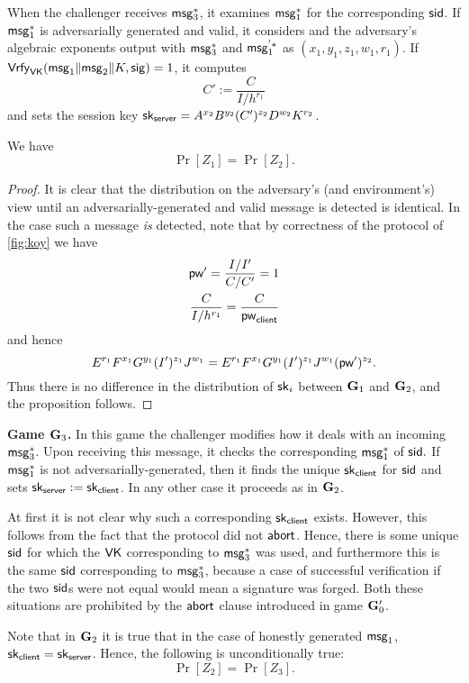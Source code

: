 When the challenger receives $\mathsf{msg}_{3}^{*}$, it examines $\mathsf{msg}_{1}^{*}$ for the corresponding $\mathsf{sid}$. If $\mathsf{msg}_{1}^{*}$ is adversarially generated and valid, it considers and the adversary's algebraic exponents output with $\mathsf{msg}_{3}^{*}$ and $\mathsf{msg}_{1}^{'*}$ as $(x_1,y_1,z_1,w_1,r_1)$. If $\mathsf{Vrfy}_{\mathsf{VK}}(\mathsf{msg}_{1}\|\mathsf{msg}_{2}\|K,\mathsf{sig})=1$, it computes $$C':= \frac{C}{I/h^{r_1}}$$ and sets the session key $\mathsf{sk}_{\mathsf{server}} = A^{x_2}B^{y_2}(C')^{z_2}D^{w_2}K^{r_2}$.

\begin{lemma} We have
	$$\Pr[Z_1]=\Pr[Z_2].$$
\end{lemma}

\begin{proof}
	It is clear that the distribution on the adversary's (and environment's) view until an adversarially-generated and valid message is detected is identical. In the case such a message \textit{is} detected, note that by correctness of the protocol of \cref{fig:koy} we have
	\begin{align*}
		\mathsf{pw}'=\frac{I/I'}{C/C'}=1\\
		\frac{C}{I/h^{r_1}} = \frac{C}{\mathsf{pw}_{\mathsf{client}}}
	\end{align*}
	and hence $$E^{r_1}F^{x_1}G^{y_1}(I')^{z_1}J^{w_1} = E^{r_1}F^{x_1}G^{y_1}(I')^{z_1}J^{w_1}(\mathsf{pw}')^{z_2}.$$ Thus there is no difference in the distribution of $\mathsf{sk}_i$ between $\mathbf{G}_1$ and $\mathbf{G}_2$, and the proposition follows.
\end{proof}

\textbf{Game $\mathbf{G}_3$.} In this game the challenger modifies how it deals with an incoming $\mathsf{msg}_{3}^{*}$. Upon receiving this message, it checks the corresponding $\mathsf{msg}_{1}^{*}$ of $\mathsf{sid}.$ If $\mathsf{msg}_{1}^{*}$ is not adversarially-generated, then it finds the unique $\mathsf{sk}_{\mathsf{client}}$ for $\mathsf{sid}$ and sets $\mathsf{sk}_{\mathsf{server}} := \mathsf{sk}_{\mathsf{client}}$. In any other case it proceeds as in $\mathbf{G}_2$.

At first it is not clear why such a corresponding $\mathsf{sk}_{\mathsf{client}}$ exists. However, this follows from the fact that the protocol did not $\mathsf{abort}$. Hence, there is some unique $\mathsf{sid}$ for which the $\mathsf{VK}$ corresponding to $\mathsf{msg}_{3}^{*}$ was used, and furthermore this is the same $\mathsf{sid}$ corresponding to $\mathsf{msg}_{3}^{*}$, because a case of successful verification if the two $\mathsf{sid}$s were not equal would mean a signature was forged. Both these situations are prohibited by the $\mathsf{abort}$ clause introduced in game $\mathbf{G}_0'$.

Note that in $\mathbf{G}_2$ it is true that in the case of honestly generated $\mathsf{msg}_{1}$, $\mathsf{sk}_{\mathsf{client}} = \mathsf{sk}_{\mathsf{server}}$. Hence, the following is unconditionally true: $$\Pr[Z_2]=\Pr[Z_3].$$

